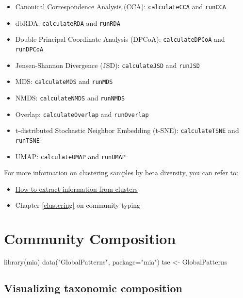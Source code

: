 \documentclass[
]{book}
\newenvironment{Shaded}{\begin{snugshade}}{\end{snugshade}}
\newcommand{\AttributeTok}[1]{\textcolor[rgb]{0.77,0.63,0.00}{#1}}
\newcommand{\FunctionTok}[1]{\textcolor[rgb]{0.00,0.00,0.00}{#1}}
\newcommand{\NormalTok}[1]{#1}
\newcommand{\OtherTok}[1]{\textcolor[rgb]{0.56,0.35,0.01}{#1}}
\newcommand{\StringTok}[1]{\textcolor[rgb]{0.31,0.60,0.02}{#1}}
\providecommand{\tightlist}{%
  \setlength{\itemsep}{0pt}\setlength{\parskip}{0pt}}
\begin{document}
\begin{itemize}
\tightlist
\item
  Canonical Correspondence Analysis (CCA): \texttt{calculateCCA} and \texttt{runCCA}
\item
  dbRDA: \texttt{calculateRDA} and \texttt{runRDA}
\item
  Double Principal Coordinate Analysis (DPCoA): \texttt{calculateDPCoA} and \texttt{runDPCoA}
\item
  Jensen-Shannon Divergence (JSD): \texttt{calculateJSD} and \texttt{runJSD}
\item
  MDS: \texttt{calculateMDS} and \texttt{runMDS}
\item
  NMDS: \texttt{calculateNMDS} and \texttt{runNMDS}
\item
  Overlap: \texttt{calculateOverlap} and \texttt{runOverlap}
\item
  t-distributed Stochastic Neighbor Embedding (t-SNE): \texttt{calculateTSNE} and \texttt{runTSNE}
\item
  UMAP: \texttt{calculateUMAP} and \texttt{runUMAP}
\end{itemize}

For more information on clustering samples by beta diversity, you can refer to:

\begin{itemize}
\tightlist
\item
  \href{http://bioconductor.org/books/release/OSCA/clustering.html}{How to extract information from clusters}
\item
  Chapter \ref{clustering} on community typing
\end{itemize}

\hypertarget{microbiome-community}{%
\chapter{Community Composition}\label{microbiome-community}}

\begin{Shaded}
\begin{Highlighting}[]
\FunctionTok{library}\NormalTok{(mia)}
\FunctionTok{data}\NormalTok{(}\StringTok{"GlobalPatterns"}\NormalTok{, }\AttributeTok{package=}\StringTok{"mia"}\NormalTok{)}
\NormalTok{tse }\OtherTok{\textless{}{-}}\NormalTok{ GlobalPatterns}
\end{Highlighting}
\end{Shaded}

\hypertarget{visual-composition}{%
\section{Visualizing taxonomic composition}\label{visual-composition}}
\end{document}
